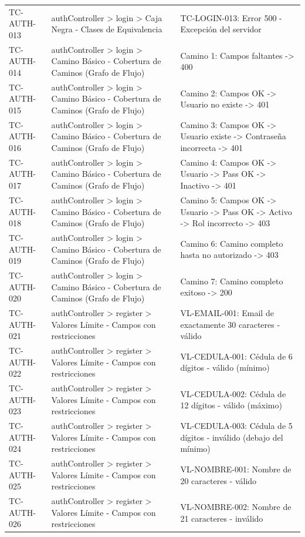 \begin{longtable}{l L{0.30\textwidth} L{0.40\textwidth}}
TC-AUTH-013 & authController > login > Caja Negra - Clases de Equivalencia & TC-LOGIN-013: Error 500 - Excepción del servidor \\
TC-AUTH-014 & authController > login > Camino Básico - Cobertura de Caminos (Grafo de Flujo) & Camino 1: Campos faltantes -> 400 \\
TC-AUTH-015 & authController > login > Camino Básico - Cobertura de Caminos (Grafo de Flujo) & Camino 2: Campos OK -> Usuario no existe -> 401 \\
TC-AUTH-016 & authController > login > Camino Básico - Cobertura de Caminos (Grafo de Flujo) & Camino 3: Campos OK -> Usuario existe -> Contraseña incorrecta -> 401 \\
TC-AUTH-017 & authController > login > Camino Básico - Cobertura de Caminos (Grafo de Flujo) & Camino 4: Campos OK -> Usuario -> Pass OK -> Inactivo -> 401 \\
TC-AUTH-018 & authController > login > Camino Básico - Cobertura de Caminos (Grafo de Flujo) & Camino 5: Campos OK -> Usuario -> Pass OK -> Activo -> Rol incorrecto -> 403 \\
TC-AUTH-019 & authController > login > Camino Básico - Cobertura de Caminos (Grafo de Flujo) & Camino 6: Camino completo hasta no autorizado -> 403 \\
TC-AUTH-020 & authController > login > Camino Básico - Cobertura de Caminos (Grafo de Flujo) & Camino 7: Camino completo exitoso -> 200 \\
TC-AUTH-021 & authController > register > Valores Límite - Campos con restricciones & VL-EMAIL-001: Email de exactamente 30 caracteres - válido \\
TC-AUTH-022 & authController > register > Valores Límite - Campos con restricciones & VL-CEDULA-001: Cédula de 6 dígitos - válido (mínimo) \\
TC-AUTH-023 & authController > register > Valores Límite - Campos con restricciones & VL-CEDULA-002: Cédula de 12 dígitos - válido (máximo) \\
TC-AUTH-024 & authController > register > Valores Límite - Campos con restricciones & VL-CEDULA-003: Cédula de 5 dígitos - inválido (debajo del mínimo) \\
TC-AUTH-025 & authController > register > Valores Límite - Campos con restricciones & VL-NOMBRE-001: Nombre de 20 caracteres - válido \\
TC-AUTH-026 & authController > register > Valores Límite - Campos con restricciones & VL-NOMBRE-002: Nombre de 21 caracteres - inválido \\

\end{longtable}
